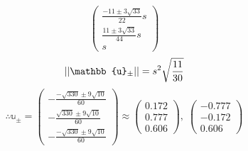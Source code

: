 \begin{enumerate}[wide, labelindent = 0pt, label = (\roman*)]
\[\begin{pmatrix}
        \frac{-11 \pm 3\sqrt{33}}{22} s \\
        \frac{ 11 \pm 3\sqrt{33}}{44} s \\
        s
    \end{pmatrix}
\]
\[
    \norm{\mathbb{u}_\pm} = s^2 \sqrt{\frac{11}{30}}
\]
\[
    \therefore \mathbb{u}_\pm = \begin{pmatrix}
        -\frac{-\sqrt{330} \pm 9\sqrt{10}}{60} \\
        -\frac{ \sqrt{330} \pm 9\sqrt{10}}{60} \\
        -\frac{-\sqrt{330} \pm 9\sqrt{10}}{60}
    \end{pmatrix}
    \approx \begin{pmatrix}
        0.172 \\ 0.777 \\ 0.606
    \end{pmatrix},\; \begin{pmatrix}
        -0.777 \\ -0.172 \\ 0.606
    \end{pmatrix}
\]

\end{enumerate}